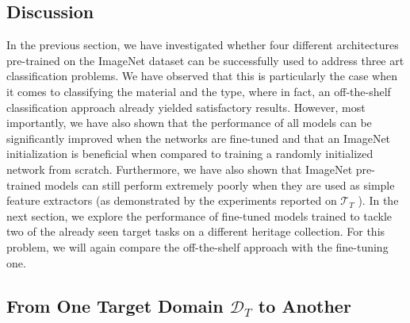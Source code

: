 

\subsection{Discussion}
\label{subsec: RijksDiscussion}
In the previous section, we have investigated whether four different architectures pre-trained on the ImageNet dataset can be successfully used to address three art classification problems. We have observed that this is particularly the case when it comes to classifying the material and the type, where in fact, an off-the-shelf classification approach already yielded satisfactory results. However, most importantly, we have also shown that the performance of all models can be significantly improved when the networks are fine-tuned and that an ImageNet initialization is beneficial when compared to training a randomly initialized network from scratch. Furthermore, we have also shown that ImageNet pre-trained models can still perform extremely poorly when they are used as simple feature extractors (as demonstrated by the experiments reported on $\mathcal{T}_T$ ). In the next section, we explore the performance of fine-tuned models trained to tackle two of the already seen target tasks on a different heritage collection. For this problem, we will again compare the off-the-shelf approach with the fine-tuning one.

\subsection{From One Target Domain $\mathcal{D}_T$ to Another} 
\label{subsec: from_one_to_another}

